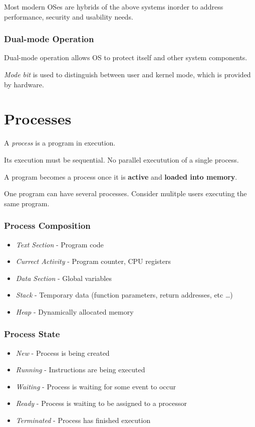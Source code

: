 \documentclass[]{article}
\begin{document}
Most modern OSes are hybrids of the above systems inorder to address performance, security and usability needs.

\subsubsection*{Dual-mode Operation}

Dual-mode operation allows OS to protect itself and other system components.

\emph{Mode bit} is used to distinguish between user and kernel mode, which is provided by hardware.

\section{Processes}

A \emph{process} is a program in execution. 

Its execution must be sequential. No parallel executution of a single process.

A program becomes a process once it is \textbf{active} and \textbf{loaded into memory}.

One program can have several processes. Consider mulitple users executing the same program.

\subsubsection*{Process Composition}

\begin{itemize}
    \item \emph{Text Section} - Program code
    \item \emph{Currect Activity} - Program counter, CPU registers
    \item \emph{Data Section} - Global variables
    \item \emph{Stack} - Temporary data (function parameters, return addresses, etc \dots)
    \item \emph{Heap} - Dynamically allocated memory
\end{itemize}

\subsubsection*{Process State}

\begin{itemize}
    \item \emph{New} - Process is being created
    \item \emph{Running} - Instructions are being executed
    \item \emph{Waiting} - Process is waiting for some event to occur
    \item \emph{Ready} - Process is waiting to be assigned to a processor
    \item \emph{Terminated} - Process has finished execution
\end{itemize}
\end{document}
